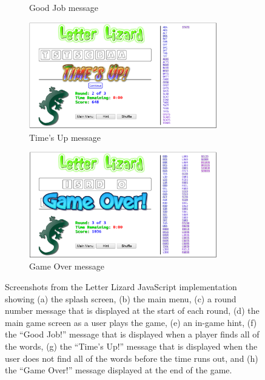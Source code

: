\begin{figure}
\begin{subfigure}{0.49\textwidth}
        \caption{Good Job message}
        \label{lljsgoodjob}
    \end{subfigure}
    \begin{subfigure}{0.49\textwidth}
        \includegraphics[width=0.9\textwidth]{../screenshots/LetterLizardJS-TimesUp.png}
        \caption{Time's Up message}
        \label{lljstimeup}
    \end{subfigure}
    \begin{subfigure}{0.49\textwidth}
        \includegraphics[width=0.9\textwidth]{../screenshots/LetterLizardJS-GameOver2.png}
        \caption{Game Over message}
        \label{lljsgameover}
    \end{subfigure}
    \caption{Screenshots from the Letter Lizard JavaScript implementation showing
    (a) the splash screen, (b) the main menu, (c) a round number message that is 
    displayed at the start of each round, (d) the main game screen as a user plays
    the game, (e) an in-game hint, (f) the ``Good Job!'' message that is displayed when
    a player finds all of the words, (g) the ``Time's Up!'' message that is displayed
    when the user does not find all of the words before the time runs out, and (h)
    the ``Game Over!'' message displayed at the end of the game.}
    \label{lljsscreenshots}
\end{figure}

